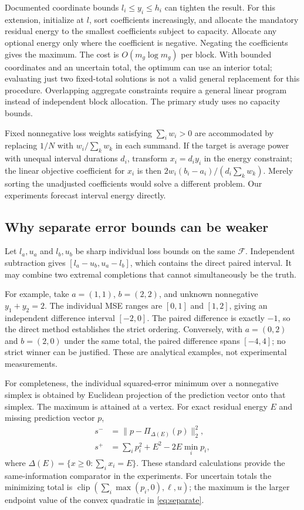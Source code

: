 \documentclass[12pt]{article}
\newcommand{\F}{\mathcal{F}}
\newcommand{\clip}{\operatorname{clip}}
\begin{document}
Documented coordinate bounds $l_i\leq y_i\leq h_i$ can tighten the result.
For this extension, initialize at $l$, sort coefficients increasingly, and
allocate the mandatory residual energy to the smallest coefficients subject
to capacity. Allocate any optional energy only where the coefficient is
negative. Negating the coefficients gives the maximum. The cost is
$O(m_g\log m_g)$ per block. With bounded coordinates and an uncertain total,
the optimum can use an interior total; evaluating just two fixed-total
solutions is not a valid general replacement for this procedure.
Overlapping aggregate constraints require a general linear program instead
of independent block allocation. The primary study uses no capacity bounds.

Fixed nonnegative loss weights satisfying $\sum_i w_i>0$ are accommodated by replacing $1/N$ with
$w_i/\sum_k w_k$ in each summand. If the target is average power with
unequal interval durations $d_i$, transform $x_i=d_i y_i$ in the energy
constraint; the linear objective coefficient for $x_i$ is then
$2w_i(b_i-a_i)/(d_i\sum_k w_k)$. Merely sorting the unadjusted coefficients
would solve a different problem. Our experiments forecast interval energy
directly.

\subsection{Why separate error bounds can be weaker}
Let $l_a,u_a$ and $l_b,u_b$ be sharp individual loss bounds on the same
$\F$. Independent subtraction gives $[l_a-u_b,u_a-l_b]$, which contains
the direct paired interval. It may combine two extremal completions that
cannot simultaneously be the truth.

For example, take $a=(1,1)$, $b=(2,2)$, and unknown nonnegative
$y_1+y_2=2$. The individual MSE ranges are $[0,1]$ and $[1,2]$, giving
an independent difference interval $[-2,0]$. The paired difference is
exactly $-1$, so the direct method establishes the strict ordering.
Conversely, with $a=(0,2)$ and $b=(2,0)$ under the same total, the
paired difference spans $[-4,4]$; no strict winner can be justified.
These are analytical examples, not experimental measurements.

For completeness, the individual squared-error minimum over a nonnegative
simplex is obtained by Euclidean projection of the prediction vector onto
that simplex. The maximum is attained at a vertex. For exact residual
energy $E$ and missing prediction vector $p$,
\begin{align}
 s^-&=\|p-\Pi_{\Delta(E)}(p)\|_2^2,\\
 s^+&=\sum_i p_i^2+E^2-2E\min_i p_i,
 \label{eq:separate}
\end{align}
where $\Delta(E)=\{x\geq0:\sum_i x_i=E\}$. These standard calculations
provide the same-information comparator in the experiments. For uncertain
totals the minimizing total is
$\clip(\sum_i\max(p_i,0),\ell,u)$; the maximum is the larger endpoint
value of the convex quadratic in \eqref{eq:separate}.
\end{document}

